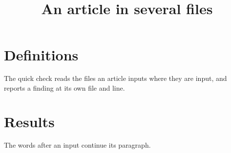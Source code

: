 \documentclass{article}
\title{An article in several files}
\begin{document}
\maketitle

\section{Definitions}
The quick check reads the files an article inputs where they are input, and reports a finding at its own file and line.


\section{Results}

 The words after an input continue its paragraph.


\end{document}
